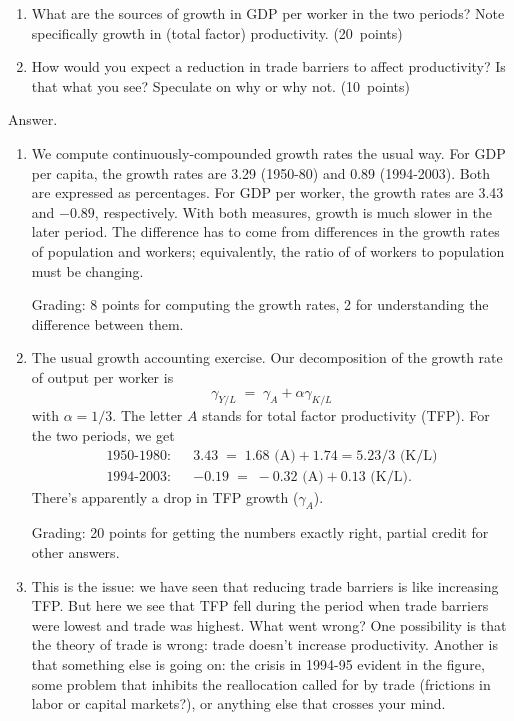 \documentclass[letterpaper,12pt]{article}
\begin{document}
\begin{enumerate}
\begin{enumerate}
\item What are the sources of growth in GDP per worker 
in the two periods?  
Note specifically growth in (total factor) productivity.  
(20~points)

\item How would you expect a reduction in trade barriers  
to affect productivity?
Is that what you see?  
Speculate on why or why not.   
(10~points)
\end{enumerate}


Answer.
\begin{enumerate}

\item We compute continuously-compounded growth rates the usual way.
For GDP per capita, the growth rates 
are 3.29 (1950-80) and 0.89 (1994-2003).  
Both are expressed as percentages.
For GDP per worker, the growth rates are 3.43 and $-0.89$, respectively.  
With both measures, growth is much slower in the later period.  
The difference has to come from differences in the growth rates 
of population and workers; equivalently, the ratio of 
of workers to population must be changing.  

Grading:  8 points for computing the growth rates, 
2 for understanding the difference between them.  

\item The usual growth accounting exercise.  
Our decomposition of the growth rate of output per worker is 
\[
        \gamma_{Y/L} \;=\; \gamma_A + \alpha \gamma_{K/L}  
\]
with $\alpha = 1/3$.
The letter $A$ stands for total factor productivity (TFP).    
For the two periods, we get 
\begin{eqnarray*}
    \mbox{1950-1980:} &&  3.43  \;=\; 1.68 \mbox{ (A)} 
                +  1.74 = 5.23/3 \mbox{ (K/L)}   \\
    \mbox{1994-2003:} &&  -0.19 \;=\; -0.32 \mbox{ (A)} 
                +  0.13 \mbox{ (K/L)} .
\end{eqnarray*}
There's apparently a drop in TFP growth ($\gamma_A$).  

Grading: 20 points for getting the numbers exactly right, 
partial credit for other answers.  

\item This is the issue:  we have seen that reducing trade barriers
is like increasing TFP.  
But here we see that TFP fell during the period when trade 
barriers were lowest and trade was highest.  
What went wrong?  
One possibility is that the theory of trade is wrong:  
trade doesn't increase productivity.
Another is that something else is going on:  
the crisis in 1994-95 evident in the figure, 
some problem that inhibits the reallocation 
called for by trade (frictions 
in labor or capital markets?), 
or anything else that crosses your mind.  


\end{enumerate}
\end{enumerate}
\end{document}
